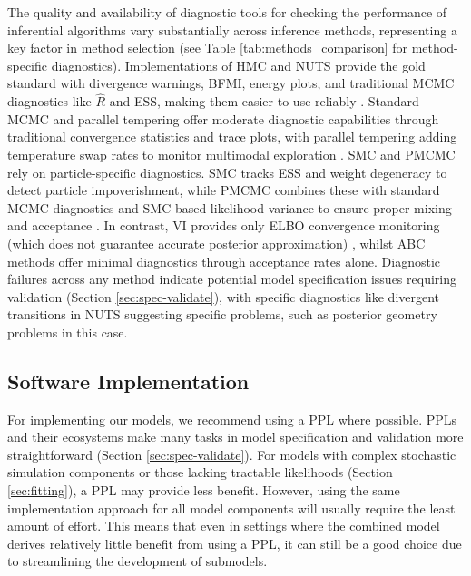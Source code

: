 \documentclass{article}
\begin{document}
The quality and availability of diagnostic tools for checking the performance of inferential algorithms vary substantially across inference methods, representing a key factor in method selection (see Table \ref{tab:methods_comparison} for method-specific diagnostics).
Implementations of \ac{HMC} and \ac{NUTS} provide the gold standard with divergence warnings, \ac{BFMI}, energy plots, and traditional \ac{MCMC} diagnostics like $\hat{R}$ and \ac{ESS}, making them easier to use reliably \citep{betancourt2017conceptual, carpenter2017stan}.
 Standard \ac{MCMC} and parallel tempering offer moderate diagnostic capabilities through traditional convergence statistics and trace plots, with parallel tempering adding temperature swap rates to monitor multimodal exploration \citep{honkela2020computational}. \ac{SMC} and \ac{PMCMC} rely on particle-specific diagnostics. \ac{SMC} tracks \ac{ESS} and weight degeneracy to detect particle impoverishment, while \ac{PMCMC} combines these with standard \ac{MCMC} diagnostics and \ac{SMC}-based likelihood variance to ensure proper mixing and acceptance \citep{michaud2021sequential, andrieu2010particle}.  In contrast, \ac{VI} provides only \ac{ELBO} convergence monitoring (which does not guarantee accurate posterior approximation) \citep{blei2017variational, chatzilena2019contemporary}, whilst \ac{ABC} methods offer minimal diagnostics through acceptance rates alone.
Diagnostic failures across any method indicate potential model specification issues requiring validation (Section \ref{sec:spec-validate}), with specific diagnostics like divergent transitions in \ac{NUTS} suggesting specific problems, such as posterior geometry problems in this case.

\subsection{Software Implementation}\label{sec:implementation}

For implementing our models, we recommend using a \ac{PPL} where possible.
\ac{PPL}s and their ecosystems make many tasks in model specification and validation more straightforward (Section \ref{sec:spec-validate}).
For models with complex stochastic simulation components or those lacking tractable likelihoods (Section \ref{sec:fitting}), a \ac{PPL} may provide less benefit.
However, using the same implementation approach for all model components will usually require the least amount of effort.
This means that even in settings where the combined model derives relatively little benefit from using a  \ac{PPL}, it can still be a good choice due to streamlining the development of submodels.
\end{document}
